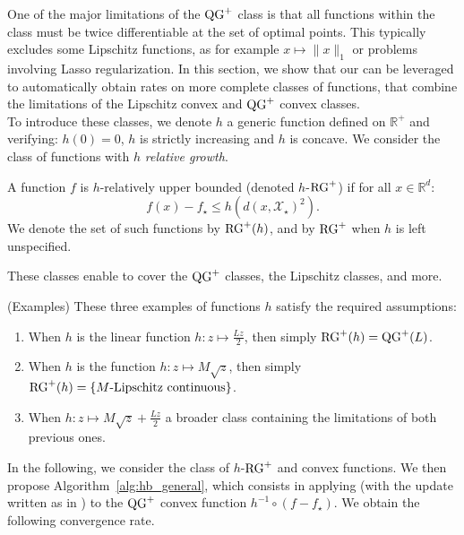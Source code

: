         One of the major limitations of the $\operatorname{QG}^+$ class is that all functions within the class must be twice differentiable at the set of optimal points.
        This typically excludes some Lipschitz functions, as for example $x \mapsto \|x\|_1$ or problems involving Lasso regularization.
        In this section, we show that our  can be leveraged to automatically obtain rates on more complete classes of functions, that combine the limitations of the Lipschitz convex and $\operatorname{QG}^+$ convex classes.\\
        To introduce these classes, we denote $h$ a generic function defined on $\mathbb{R}^+$ and verifying: $h(0)=0$, $h$ is strictly increasing and $h$ is concave.
        We consider the class of functions with $h$ \textit{relative growth}.
        \begin{Def}
            A function $f$ is $h$-relatively upper bounded (denoted $h$-$\operatorname{RG}^+$) if for all $x \in \mathbb{R}^d$: \[f(x)-f_\star \leq h\left( d(x, \mathcal{X}_\star)^2 \right).\]
            We denote the set of such functions by $\operatorname{RG}^+(h)$, and by $\operatorname{RG}^+$ when $h$ is left unspecified.
            \label{def:h_rg}
        \end{Def}
        These classes enable to cover the $\operatorname{QG}^+$ classes, the Lipschitz classes, and more.
        \begin{Rem}(Examples)
            \label{rem:h_linear}
            These three examples of functions $h$ satisfy the required assumptions:
            \begin{enumerate}[noitemsep, topsep=1pt,leftmargin=*]
                \item When $h$ is the linear function $h: z \mapsto \frac{Lz}{2}$, then simply $\operatorname{RG}^+(h) = \operatorname{QG}^+(L)$.
                \item When $h$ is the function $h: z \mapsto M\sqrt{z}$, then simply $\operatorname{RG}^+(h) = \left\{ M\text{-Lipschitz continuous}\right\}$.
                \item When $h: z \mapsto M\sqrt{z} + \frac{Lz}{2}$ a broader class  containing the limitations of both previous ones.
            \end{enumerate}
        \end{Rem}
        In the following, we consider the class of $h$-$\operatorname{RG}^+$ and convex functions.
        We then propose Algorithm~\ref{alg:hb_general}, which consists in applying  (with the update written as in ) to the $\operatorname{QG}^+$ convex function $h^{-1} \circ (f - f_\star)$.
        We obtain the following convergence rate.
    
